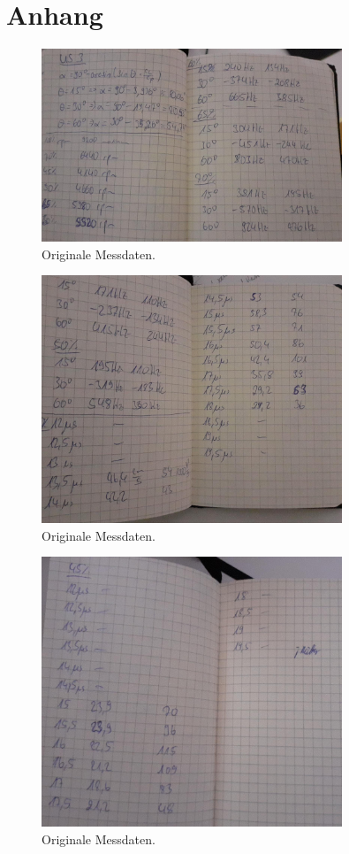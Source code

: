 \section*{Anhang}
\begin{figure}[H]
  \centering
  \includegraphics[width=9cm]{content/a1}
  \caption{Originale Messdaten.}
\end{figure}
\begin{figure}[H]
  \centering
  \includegraphics[width=9cm]{content/a2}
  \caption{Originale Messdaten.}
\end{figure}
\begin{figure}[H]
  \centering
  \includegraphics[width=9cm]{content/a3}
  \caption{Originale Messdaten.}
\end{figure}
